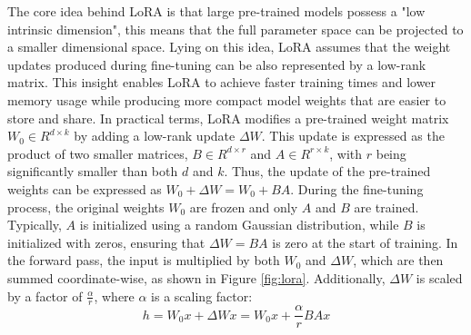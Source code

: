 \documentclass[11pt,english,listoffigures,listoftables]{tfgetsinf}
\begin{document}
The core idea behind LoRA is that large pre-trained models possess a "low intrinsic dimension", this means that the full parameter space can be projected to a smaller dimensional space. Lying on this idea, LoRA assumes that the weight updates produced during fine-tuning can be also represented by a low-rank matrix. This insight enables LoRA to achieve faster training times and lower memory usage while producing more compact model weights that are easier to store and share. In practical terms, LoRA modifies a pre-trained weight matrix $W_0 \in R^{d \times k}$ by adding a low-rank update $\Delta W$. This update is expressed as the product of two smaller matrices, $B \in R^{d \times r}$ and $ A \in R^{r \times k}$, with $r$ being significantly smaller than both $d$ and $k$. Thus, the update of the pre-trained weights can be expressed as $W_0 + \Delta W = W_0 + BA$. During the fine-tuning process, the original weights $W_0$ are frozen and only $A$ and $B$ are trained. Typically, $A$ is initialized using a random Gaussian distribution, while $B$ is initialized with zeros, ensuring that $\Delta W = BA$ is zero at the start of training. In the forward pass, the input is multiplied by both $W_0$ and $\Delta W$, which are then summed coordinate-wise, as shown in Figure \ref{fig:lora}. Additionally, $\Delta W$ is scaled by a factor of $\frac{\alpha}{r}$, where $\alpha$ is a scaling factor:
%
\begin{equation}
    h = W_0x + \Delta Wx = W_0x + \frac{\alpha}{r} BAx
\end{equation}





\end{document}
